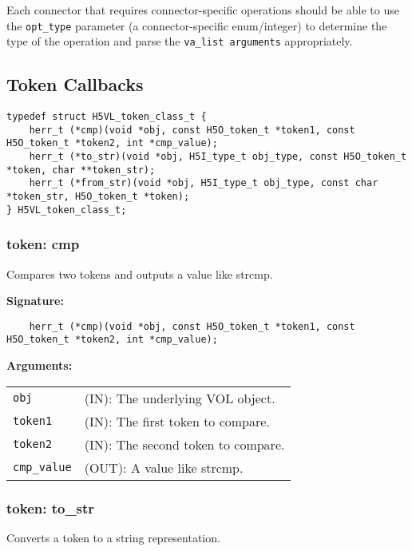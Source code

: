 Each connector that requires connector-specific operations should be able to use the \texttt{opt\_type} parameter (a connector-specific enum/integer) to determine the type of the operation and parse the \texttt{va\_list arguments} appropriately.



\subsection{Token Callbacks}

\begin{lstlisting}[caption={Structure for token callback routines, H5VLconnector.h}, captionpos=b, label={lst:Tokenclass}]
typedef struct H5VL_token_class_t { 
    herr_t (*cmp)(void *obj, const H5O_token_t *token1, const H5O_token_t *token2, int *cmp_value);
    herr_t (*to_str)(void *obj, H5I_type_t obj_type, const H5O_token_t *token, char **token_str);
    herr_t (*from_str)(void *obj, H5I_type_t obj_type, const char *token_str, H5O_token_t *token);
} H5VL_token_class_t;
\end{lstlisting}

\subsubsection{token: cmp}
Compares two tokens and outputs a value like strcmp.

\begin{mdframed}[style=bgbox]
\textbf{Signature:}
\begin{lstlisting}
    herr_t (*cmp)(void *obj, const H5O_token_t *token1, const H5O_token_t *token2, int *cmp_value);
\end{lstlisting}

\textbf{Arguments:}\\
\begin{tabular}{l p{13.5cm}}
  \texttt{obj} & (IN): The underlying VOL object.\\
  \texttt{token1} & (IN): The first token to compare.\\
  \texttt{token2} & (IN): The second token to compare.\\
  \texttt{cmp\_value} & (OUT): A value like strcmp.\\
\end{tabular}
\end{mdframed}

\subsubsection{token: to\_str}
Converts a token to a string representation.

